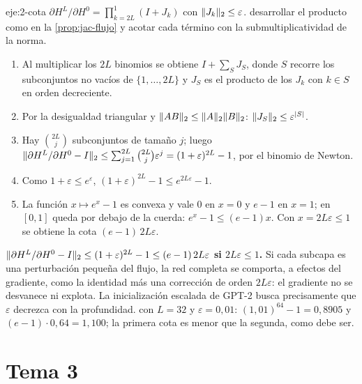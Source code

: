 \begin{solucion}{eje:2-cota}
\datos $\partial H^{L}/\partial H^{0}=\prod_{k=2L}^{1}(I+J_k)$ con $\lVert J_k\rVert_2\le\varepsilon$.
\planteamiento desarrollar el producto como en la \cref{prop:jac-flujo} y acotar cada término con la submultiplicatividad de la norma.
\pasos
\begin{enumerate}[label=\arabic*.]
  \item Al multiplicar los $2L$ binomios se obtiene $I+\sum_{S}J_S$, donde $S$ recorre los subconjuntos no vacíos de $\{1,\dots,2L\}$ y $J_S$ es el producto de los $J_k$ con $k\in S$ en orden decreciente.
  \item Por la desigualdad triangular y $\lVert AB\rVert_2\le\lVert A\rVert_2\lVert B\rVert_2$: $\lVert J_S\rVert_2\le\varepsilon^{\lvert S\rvert}$.
  \item Hay $\binom{2L}{j}$ subconjuntos de tamaño $j$; luego $\lVert\partial H^{L}/\partial H^{0}-I\rVert_2\le\sum_{j=1}^{2L}\binom{2L}{j}\varepsilon^{j}=(1+\varepsilon)^{2L}-1$, por el binomio de Newton.
  \item Como $1+\varepsilon\le e^{\varepsilon}$, $(1+\varepsilon)^{2L}-1\le e^{2L\varepsilon}-1$.
  \item La función $x\mapsto e^{x}-1$ es convexa y vale $0$ en $x=0$ y $e-1$ en $x=1$; en $[0,1]$ queda por debajo de la cuerda: $e^{x}-1\le(e-1)x$. Con $x=2L\varepsilon\le 1$ se obtiene la cota $(e-1)\,2L\varepsilon$.
\end{enumerate}
\resultado \textbf{$\lVert\partial H^{L}/\partial H^{0}-I\rVert_2\le(1+\varepsilon)^{2L}-1\le(e-1)\,2L\varepsilon$ si $2L\varepsilon\le 1$.} Si cada subcapa es una perturbación pequeña del flujo, la red completa se comporta, a efectos del gradiente, como la identidad más una corrección de orden $2L\varepsilon$: el gradiente no se desvanece ni explota. La inicialización escalada de GPT-2 busca precisamente que $\varepsilon$ decrezca con la profundidad.
\comprobacion con $L=32$ y $\varepsilon=0{,}01$: $(1{,}01)^{64}-1=0{,}8905$ y $(e-1)\cdot 0{,}64=1{,}100$; la primera cota es menor que la segunda, como debe ser.
\end{solucion}

\section{Tema 3}

